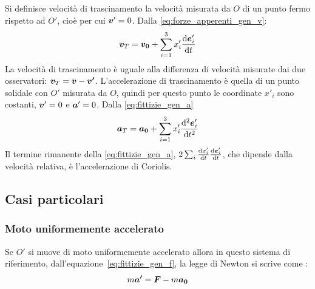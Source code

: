 Si definisce velocità di trascinamento la velocità misurata da $O$ di un punto fermo rispetto ad $O'$, cioè per cui $\boldsymbol{v}'=0$. Dalla \eqref{eq:forze_apperenti_gen_v}:
\begin{equation}
  \boldsymbol{v}_T = \boldsymbol{v_0}+\sum_{i=1}^3 x'_i\frac{\mathrm{d} \boldsymbol{e}'_i}{\mathrm{d} t}
  \label{eq:fittizie_gen_vt}
\end{equation}
La velocità di trascinamento è uguale alla differenza di velocità misurate dai due osservatori: $\boldsymbol{v}_T = \boldsymbol{v} - \boldsymbol{v'}$.
L'accelerazione di trascinamento è quella di un punto solidale con $O'$ misurata da $O$, quindi per questo punto le coordinate $x'_i$ sono costanti, $\boldsymbol{v}'=0$ e $\boldsymbol{a}'=0$. Dalla \eqref{eq:fittizie_gen_a}
\begin{equation}
  \boldsymbol{a}_T = \boldsymbol{a_0}
  + \sum_{i=1}^3 x'_i\frac{\mathrm{d}^2 \boldsymbol{e}'_i}{\mathrm{d} t^2}
\end{equation}
Il termine rimanente della \eqref{eq:fittizie_gen_a}, $2\sum_i \frac{\mathrm{d} x'_i}{\mathrm{d} t}\frac{\mathrm{d} \boldsymbol{e}'_i}{\mathrm{d} t}$, che dipende dalla velocità relativa, è l'accelerazione di Coriolis.




\subsection{Casi particolari}
\subsubsection{Moto uniformemente accelerato}
Se $O'$ si muove di moto uniformemente accelerato allora in questo sistema di riferimento, dall'equazione~\eqref{eq:fittizie_gen_f}, la legge di Newton si scrive come :
\begin{equation}
  m\boldsymbol{a'} = \boldsymbol{F} - m\boldsymbol{a_0}
\end{equation}

